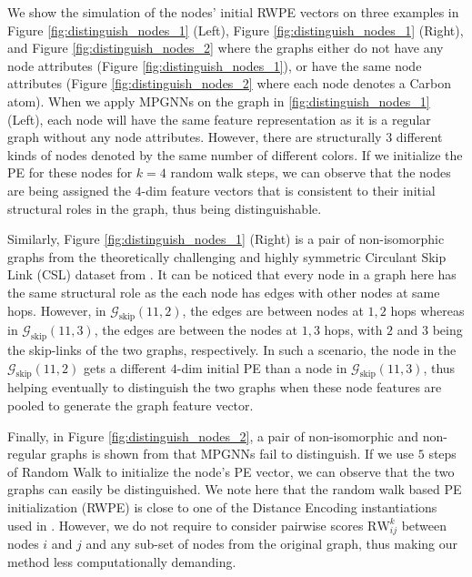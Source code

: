 \documentclass{article} \usepackage{iclr2021_conference,times}
\begin{document}
We show the simulation of the nodes' initial RWPE vectors on three examples in Figure \ref{fig:distinguish_nodes_1} (Left), Figure \ref{fig:distinguish_nodes_1} (Right), and Figure \ref{fig:distinguish_nodes_2} where the graphs either do not have any node attributes (Figure \ref{fig:distinguish_nodes_1}), or have the same node attributes (Figure \ref{fig:distinguish_nodes_2} where each node denotes a Carbon atom). When we apply MPGNNs on the graph in \ref{fig:distinguish_nodes_1} (Left), each node will have the same feature representation as it is a regular graph without any node attributes. However, there are structurally 3 different kinds of nodes denoted by the same number of different colors. If we initialize the PE for these nodes for $k=4$ random walk steps, we can observe that the nodes are being assigned the $4$-dim feature vectors that is consistent to their initial structural roles in the graph, thus being distinguishable. 

Similarly, Figure \ref{fig:distinguish_nodes_1} (Right) is a pair of non-isomorphic graphs from the theoretically challenging and highly symmetric Circulant Skip Link (CSL) dataset from \cite{murphy2019relational}. It can be noticed that every node in a graph here has the same structural role as the each node has edges with other nodes at same hops. However, in $\mathcal{G}_{\text{skip}}(11,2)$, the edges are between nodes at ${1,2}$ hops whereas in $\mathcal{G}_{\text{skip}}(11,3)$, the edges are between the nodes at ${1,3}$ hops, with $2$ and $3$ being the skip-links of the two graphs, respectively. In such a scenario, the node in the $\mathcal{G}_{\text{skip}}(11,2)$ gets a different $4$-dim initial PE than a node in $\mathcal{G}_{\text{skip}}(11,3)$, thus helping eventually to distinguish the two graphs when these node features are pooled to generate the graph feature vector. 

Finally, in Figure \ref{fig:distinguish_nodes_2}, a pair of non-isomorphic and non-regular graphs is shown from \cite{sato2020survey} that MPGNNs fail to distinguish. 
If we use $5$ steps of Random Walk to initialize the node's PE vector, we can observe that the two graphs can easily be distinguished. We note here that the random walk based PE initialization (RWPE) is close to one of the Distance Encoding instantiations used in \cite{li2020distance}. However, we do not require to consider pairwise scores $\text{RW}^k_{ij}$ between nodes $i$ and $j$ and any sub-set of nodes from the original graph, thus making our method less computationally demanding.
\end{document}
